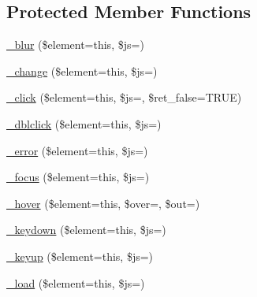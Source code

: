 \subsection*{Protected Member Functions}
\begin{DoxyCompactItemize}
\item 
\mbox{\hyperlink{class_c_i___jquery_aa7f8a8ac39c31b8a461252563b649315}{\+\_\+blur}} (\$element=\textquotesingle{}this\textquotesingle{}, \$js=\textquotesingle{}\textquotesingle{})
\item 
\mbox{\hyperlink{class_c_i___jquery_a8022153d5ff7be0585afb4b01fdb0a23}{\+\_\+change}} (\$element=\textquotesingle{}this\textquotesingle{}, \$js=\textquotesingle{}\textquotesingle{})
\item 
\mbox{\hyperlink{class_c_i___jquery_ae67ce1e331db8892591085aee04cc8e9}{\+\_\+click}} (\$element=\textquotesingle{}this\textquotesingle{}, \$js=\textquotesingle{}\textquotesingle{}, \$ret\+\_\+false=T\+R\+UE)
\item 
\mbox{\hyperlink{class_c_i___jquery_aee0c92ff0c38f067d5600734adce45c2}{\+\_\+dblclick}} (\$element=\textquotesingle{}this\textquotesingle{}, \$js=\textquotesingle{}\textquotesingle{})
\item 
\mbox{\hyperlink{class_c_i___jquery_af9e636fd7bfe3409cae73fbc5e21b223}{\+\_\+error}} (\$element=\textquotesingle{}this\textquotesingle{}, \$js=\textquotesingle{}\textquotesingle{})
\item 
\mbox{\hyperlink{class_c_i___jquery_a42226e8f0b137ccbcf3400e2c4d962de}{\+\_\+focus}} (\$element=\textquotesingle{}this\textquotesingle{}, \$js=\textquotesingle{}\textquotesingle{})
\item 
\mbox{\hyperlink{class_c_i___jquery_ab13945ae07776068a344f3cc7507fff0}{\+\_\+hover}} (\$element=\textquotesingle{}this\textquotesingle{}, \$over=\textquotesingle{}\textquotesingle{}, \$out=\textquotesingle{}\textquotesingle{})
\item 
\mbox{\hyperlink{class_c_i___jquery_a2f3bc2a622d17d35cf27e18e74e21161}{\+\_\+keydown}} (\$element=\textquotesingle{}this\textquotesingle{}, \$js=\textquotesingle{}\textquotesingle{})
\item 
\mbox{\hyperlink{class_c_i___jquery_a6a524f9502e61d9169ac77da754225e2}{\+\_\+keyup}} (\$element=\textquotesingle{}this\textquotesingle{}, \$js=\textquotesingle{}\textquotesingle{})
\item 
\mbox{\hyperlink{class_c_i___jquery_a419ad0014703b2ca948659d12b5441eb}{\+\_\+load}} (\$element=\textquotesingle{}this\textquotesingle{}, \$js=\textquotesingle{}\textquotesingle{})

\end{DoxyCompactItemize}
